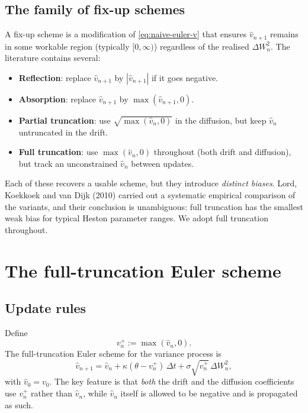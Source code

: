 \documentclass[11pt]{article}
\theoremstyle{plain}
\theoremstyle{definition}
\theoremstyle{remark}
\begin{document}
\subsection{The family of fix-up schemes}

A fix-up scheme is a modification of \eqref{eq:naive-euler-v} that ensures $\hat v_{n+1}$ remains in some workable region (typically $[0, \infty)$) regardless of the realised $\Delta W^2_n$. The literature contains several:
\begin{itemize}[topsep=2pt]
    \item \textbf{Reflection}: replace $\hat v_{n+1}$ by $|\hat v_{n+1}|$ if it goes negative.
    \item \textbf{Absorption}: replace $\hat v_{n+1}$ by $\max(\hat v_{n+1}, 0)$.
    \item \textbf{Partial truncation}: use $\sqrt{\max(\hat v_n, 0)}$ in the diffusion, but keep $\hat v_n$ untruncated in the drift.
    \item \textbf{Full truncation}: use $\max(\hat v_n, 0)$ throughout (both drift and diffusion), but track an unconstrained $\hat v_n$ between updates.
\end{itemize}

Each of these recovers a usable scheme, but they introduce \emph{distinct biases}. Lord, Koekkoek and van Dijk (2010) carried out a systematic empirical comparison of the variants, and their conclusion is unambiguous: full truncation has the smallest weak bias for typical Heston parameter ranges. We adopt full truncation throughout.

\section{The full-truncation Euler scheme}

\subsection{Update rules}

Define
\[
    v_n^+ := \max(\hat v_n, 0).
\]
The full-truncation Euler scheme for the variance process is
\begin{equation}
    \hat v_{n+1} = \hat v_n + \kappa(\theta - v_n^+)\,\Delta t + \sigma \sqrt{v_n^+}\,\Delta W^2_n,                          \label{eq:ft-v}
\end{equation}
with $\hat v_0 = v_0$. The key feature is that \emph{both} the drift and the diffusion coefficients use $v_n^+$ rather than $\hat v_n$, while $\hat v_n$ itself is allowed to be negative and is propagated as such.
\end{document}
